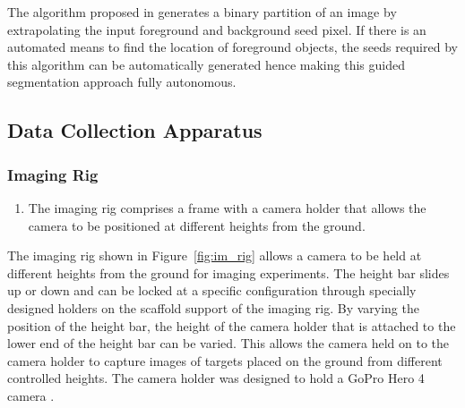 \documentclass {udthesis}
\begin{document}
The algorithm proposed in \cite{onecut} generates a binary partition of an image by extrapolating the input foreground and background seed pixel. If there is an automated means to find the location of foreground objects, the seeds required by this algorithm can be automatically generated hence making this guided segmentation approach fully autonomous.

\subsection{Data Collection Apparatus}

\subsubsection{Imaging Rig}
\label{sec:imaging_rig}

\begin{enumerate}
	\item The imaging rig comprises a frame with a camera holder that allows the camera to be positioned at different heights from the ground.
\end{enumerate}


The imaging rig shown in Figure~\ref{fig:im_rig} allows a camera to be held at different heights from the ground for imaging experiments. The height bar slides up or down and can be locked at a specific configuration through specially designed holders on the scaffold support of the imaging rig. By varying the position of the height bar, the height of the camera holder that is attached to the lower end of the height bar can be varied. This allows the camera held on to the camera holder to capture images of targets placed on the ground from different controlled heights. The camera holder was designed to hold a GoPro Hero 4 camera \cite{gopro}.
	
\end{document}
